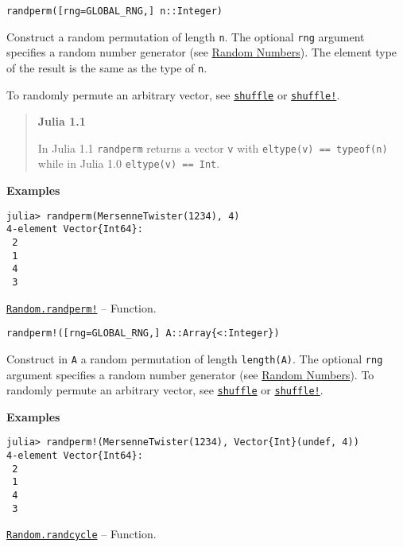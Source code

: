 \begin{adjustwidth}{2em}{0pt}


\begin{verbatim}
randperm([rng=GLOBAL_RNG,] n::Integer)
\end{verbatim}

Construct a random permutation of length \texttt{n}. The optional \texttt{rng} argument specifies a random number generator (see \href{@ref}{Random Numbers}). The element type of the result is the same as the type of \texttt{n}.

To randomly permute an arbitrary vector, see \hyperlink{16742615893822221762}{\texttt{shuffle}} or \hyperlink{15315300334019616632}{\texttt{shuffle!}}.

\begin{quote}
\textbf{Julia 1.1}

In Julia 1.1 \texttt{randperm} returns a vector \texttt{v} with \texttt{eltype(v) == typeof(n)} while in Julia 1.0 \texttt{eltype(v) == Int}.

\end{quote}
\textbf{Examples}


\begin{verbatim}
julia> randperm(MersenneTwister(1234), 4)
4-element Vector{Int64}:
 2
 1
 4
 3
\end{verbatim}



\end{adjustwidth}
\hypertarget{9956290992837499502}{}
\hyperlink{9956290992837499502}{\texttt{Random.randperm!}}  -- {Function.}

\begin{adjustwidth}{2em}{0pt}


\begin{verbatim}
randperm!([rng=GLOBAL_RNG,] A::Array{<:Integer})
\end{verbatim}

Construct in \texttt{A} a random permutation of length \texttt{length(A)}. The optional \texttt{rng} argument specifies a random number generator (see \href{@ref}{Random Numbers}). To randomly permute an arbitrary vector, see \hyperlink{16742615893822221762}{\texttt{shuffle}} or \hyperlink{15315300334019616632}{\texttt{shuffle!}}.

\textbf{Examples}


\begin{verbatim}
julia> randperm!(MersenneTwister(1234), Vector{Int}(undef, 4))
4-element Vector{Int64}:
 2
 1
 4
 3
\end{verbatim}



\end{adjustwidth}
\hypertarget{8716855906711617057}{}
\hyperlink{8716855906711617057}{\texttt{Random.randcycle}}  -- {Function.}

